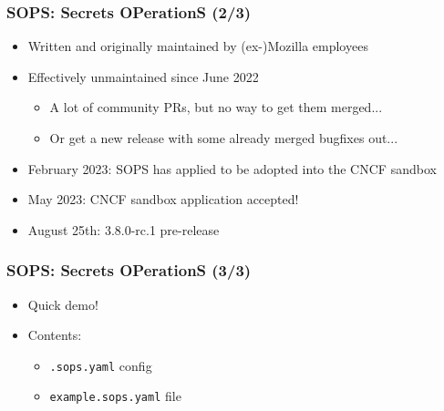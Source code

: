 \documentclass{beamer}
\begin{document}
  \begin{frame}
    \frametitle{SOPS: Secrets OPerationS (2/3)}
    \begin{itemize}
      \item Written and originally maintained by (ex-)Mozilla employees
      \item Effectively unmaintained since June 2022
      \begin{itemize}
        \item A lot of community PRs, but no way to get them merged...
        \item Or get a new release with some already merged bugfixes out...
      \end{itemize}
      \item<2-> February 2023: SOPS has applied to be adopted into the CNCF sandbox
      \item<2-> May 2023: \alert{CNCF sandbox application accepted!}
      \item<3-> August 25th: 3.8.0-rc.1 pre-release
    \end{itemize}
  \end{frame}

  \begin{frame}[fragile]
    \frametitle{SOPS: Secrets OPerationS (3/3)}
    \begin{itemize}
      \item Quick demo!
      \item Contents:
        \begin{itemize}
          \item \lstinline{.sops.yaml} config
          \item \lstinline{example.sops.yaml} file
        \end{itemize}
    \end{itemize}
  \end{frame}
\end{document}
